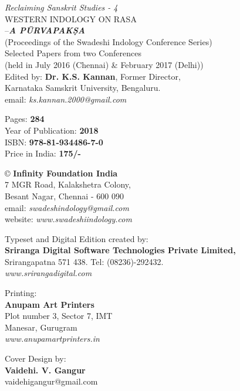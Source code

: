 \thispagestyle{empty}

 \textit{Reclaiming Sanskrit Studies - 4}\\
 WESTERN INDOLOGY ON RASA\\–\textbf{\textit{A PŪRVAPAKṢA}}\\ 
 (Proceedings of the Swadeshi Indology Conference Series)\\
 Selected Papers from two Conferences\\
 (held in July 2016 (Chennai) \& February 2017 (Delhi))\\
 Edited by: \textbf{Dr. K.S. Kannan}, Former Director,\\ 
 Karnataka Samskrit University, Bengaluru.\\
 email: \textit{ks.kannan.2000@gmail.com}

 Pages: \textbf{284}\\
 Year of Publication: \textbf{2018}\\
 ISBN: \textbf{978-81-934486-7-0}\\
 Price in India: \textbf{175/-}

 © \textbf{Infinity Foundation India}\\
 7 MGR Road, Kalakshetra Colony,\\
 Besant Nagar, Chennai - 600 090\\
 email: \textit{swadeshindology@gmail.com}\\
 website: \textit{www.swadeshiindology.com}

 Typeset and Digital Edition created by:\\\textbf{Sriranga Digital Software Technologies Private Limited,}\\
 Srirangapatna 571 438. Tel: (08236)-292432.\\\textit{www.srirangadigital.com}

 Printing:\\\textbf{Anupam Art Printers}\\
 Plot number 3, Sector 7, IMT\\
 Manesar, Gurugram\\\textit{www.anupamartprinters.in}

 Cover Design by:\\\textbf{Vaidehi. V. Gangur}\\
 vaidehigangur@gmail.com


